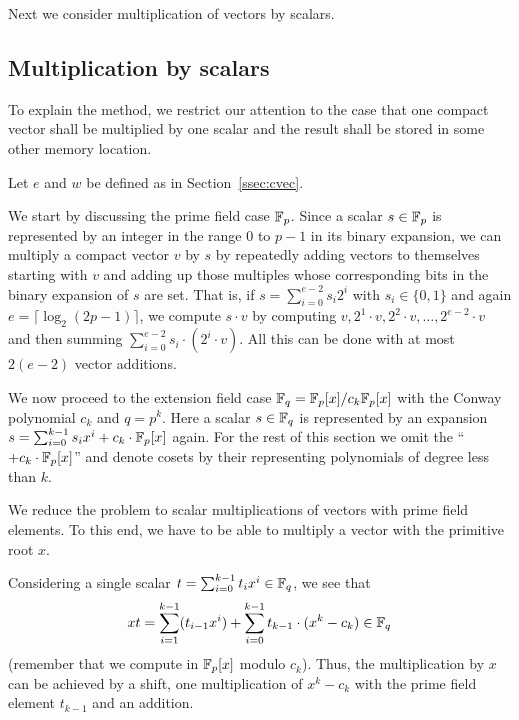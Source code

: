 Next we consider multiplication of vectors by scalars.

\subsection{Multiplication by scalars}

To explain the method, we restrict our attention to the case that one
compact vector shall be multiplied by one scalar and the result 
shall be stored in some other memory location.

Let $e$ and $w$ be defined as in Section~\ref{ssec:cvec}.

We start by discussing the prime field case $\mathbb{F}_p$.
Since a scalar $s \in \mathbb{F}_p$ is represented by an integer in the range $0$ 
to $p-1$ in its binary expansion, we can multiply a compact vector $v$
by $s$ by repeatedly adding vectors to themselves starting with $v$ and
adding up those multiples
whose corresponding bits in the binary expansion of $s$ are set. That is,
if $s = \sum_{i=0}^{e-2} s_i 2^i$ with $s_i \in \{0,1\}$ and again
$e = \lceil \log_2(2p-1) \rceil$, we compute $s\cdot v$ by computing
$v, 2^1 \cdot v, 2^2 \cdot v, \ldots, 2^{e-2} \cdot v$ and then summing
$\sum_{i=0}^{e-2} s_i \cdot (2^i \cdot v)$.
All this can be done with at most $2(e-2)$ vector additions.

We now proceed to the extension field case $\mathbb{F}_q = \mathbb{F}_p[x]/c_k \mathbb{F}_p[x]$ 
with the Conway polynomial $c_k$ and $q = p^k$.
%
Here a scalar $s \in \mathbb{F}_q$ is represented by an expansion
$s = \sum_{i=0}^{k-1} s_i x^i + c_k \cdot \mathbb{F}_p[x]$ again. For the rest of this
section we omit the ``$+ c_k \cdot \mathbb{F}_p[x]$'' and denote cosets
by their representing polynomials of degree less than $k$.

We reduce the problem to scalar multiplications of vectors with
prime field elements. To this end, we have to be able to multiply
a vector with the primitive root $x$.

Considering a single scalar $t = \sum_{i=0}^{k-1} t_i x^i \in \mathbb{F}_q$, 
we see that 
\[ xt = \sum_{i=1}^{k-1} (t_{i-1}x^i) 
+ \sum_{i=0}^{k-1} t_{k-1} \cdot (x^k - c_k) \in \mathbb{F}_q \] 
(remember that we compute in $\mathbb{F}_p[x]$ modulo $c_k$).
Thus, the multiplication by $x$ can be achieved by a shift, one
multiplication of $x^k - c_k$ with the prime field element $t_{k-1}$
and an addition.

